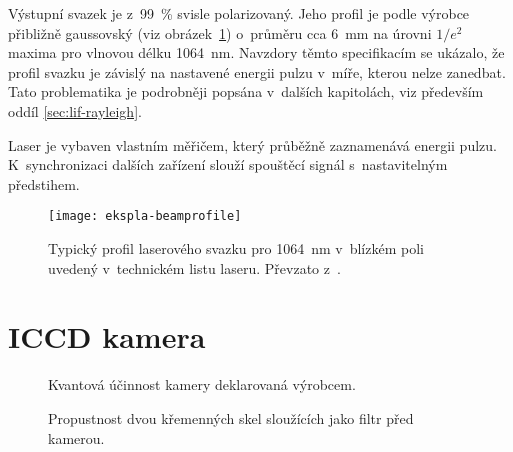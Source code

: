 Výstupní svazek je z~\SI{99}{\percent} svisle polarizovaný.
Jeho profil je podle výrobce přibližně gaussovský
(viz obrázek~\ref{fig:instruments-beamprofile})
o~průměru cca \SI{6}{\milli\metre} na úrovni $1/e^2$ maxima
pro vlnovou délku \SI{1064}{\nano\metre}.
\autocite{ekspla-datasheet}
Navzdory těmto specifikacím se ukázalo, že profil svazku je závislý
na nastavené energii pulzu v~míře, kterou nelze zanedbat.
Tato problematika je podrobněji popsána v~dalších kapitolách,
viz především oddíl \ref{sec:lif-rayleigh}.

Laser je vybaven vlastním měřičem, který průběžně zaznamenává energii pulzu.
K~synchronizaci dalších zařízení slouží spouštěcí signál s~nastavitelným
předstihem.\autocite{ekspla-datasheet}

\begin{figure}[htp]
	\centering
	\texttt{[image: ekspla-beamprofile]}
	\caption{Typický profil laserového svazku pro \SI{1064}{\nano\metre}
		v~blízkém poli uvedený v~technickém listu laseru.
		Převzato z~\cite{ekspla-datasheet}.}
	\label{fig:instruments-beamprofile}
\end{figure}

\section{ICCD kamera }
\label{sec:instruments-iccd}

\begin{figure}[htp]
	\centering
	
	\caption{Kvantová účinnost kamery deklarovaná výrobcem.}
	\label{fig:instruments-cameraeff}
\end{figure}

\begin{figure}[htp]
	\centering
	
	\caption{Propustnost dvou křemenných skel sloužících jako filtr
		před kamerou.}
	\label{fig:instruments-camerafilter}
\end{figure}

